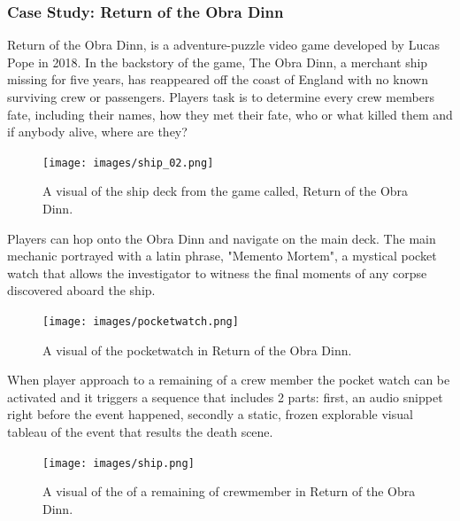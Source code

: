             \subsubsection{Case Study: Return of the Obra Dinn}
            Return of the Obra Dinn, is a adventure-puzzle video game developed by Lucas Pope in 2018. In the backstory of the game, The Obra Dinn, a merchant ship missing for five years, has reappeared off the coast of England with no known surviving crew or passengers. Players task is to determine every crew members fate, including their names, how they met their fate, who or what killed them and if anybody alive, where are they?\par

            \begin{figure}[H]
                \centering
                \texttt{[image: images/ship\_02.png]}
                \caption{A visual of the ship deck from the game called, Return of the Obra Dinn.}
                \label{fig:SHIP}
            \end{figure}

            Players can hop onto the Obra Dinn and navigate on the main deck. The main mechanic portrayed with a latin phrase, "Memento Mortem", a mystical pocket watch that allows the investigator to witness the final moments of any corpse discovered aboard the ship.\par 

            \begin{figure}[H]
                \centering
                \texttt{[image: images/pocketwatch.png]}
                \caption{A visual of the pocketwatch in Return of the Obra Dinn.}
                \label{fig:POCKETWATCH}
            \end{figure}

            When player approach to a remaining of a crew member the pocket watch can be activated and it triggers a sequence that includes 2 parts: first, an audio snippet right before the event happened, secondly a static, frozen explorable visual tableau of the event that results the death scene.\par

            \begin{figure}[H]
                \centering
                \texttt{[image: images/ship.png]}
                \caption{A visual of the of a remaining of crewmember in Return of the Obra Dinn.}
                \label{fig:CREWMEMBER}
            \end{figure}

